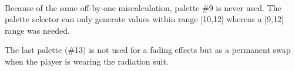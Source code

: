 \\
\par
Because of the same off-by-one miscalculation, palette \#9 is never used. The palette selector can only generate values within range [10,12] whereas a [9,12] range was needed.\\
\par
\par
The last palette (\#13) is not used for a fading effects but as a permanent swap when the player is wearing the radiation suit.\\ 
\par

